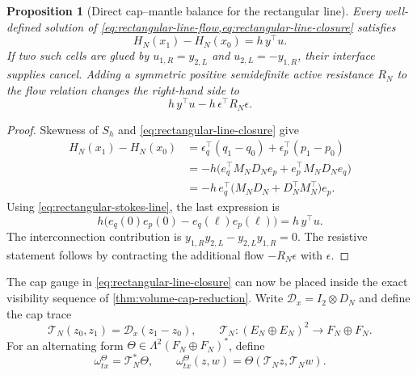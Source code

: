 \documentclass[11pt,a4paper]{article}
\newtheorem{proposition}[theorem]{Proposition}
\begin{document}
\begin{proposition}[Direct cap--mantle balance for the rectangular line]
\label{prop:rectangular-line-power}
Every well-defined solution of
\cref{eq:rectangular-line-flow,eq:rectangular-line-closure} satisfies
\begin{equation}\label{eq:rectangular-line-power}
 H_N(x_1)-H_N(x_0)=h\,y^\top u.
\end{equation}
If two such cells are glued by
\(u_{1,R}=y_{2,L}\) and \(u_{2,L}=-y_{1,R}\), their interface
supplies cancel.  Adding a symmetric positive semidefinite active
resistance \(R_N\) to the flow relation changes the right-hand side to
\[
 h\,y^\top u-h\,\epsilon^\top R_N\epsilon.
\]
\end{proposition}

\begin{proof}
Skewness of \(S_h\) and \cref{eq:rectangular-line-closure} give
\begin{align*}
 H_N(x_1)-H_N(x_0)
 &=\epsilon_q^\top(q_1-q_0)+\epsilon_p^\top(p_1-p_0)\\
 &=-h\bigl(e_q^\top M_ND_Ne_p
            +e_p^\top M_ND_Ne_q\bigr)\\
 &=-h\,e_q^\top
   \bigl(M_ND_N+D_N^\top M_N^\top\bigr)e_p.
\end{align*}
Using \cref{eq:rectangular-stokes-line}, the last expression is
\[
 h\bigl(e_q(0)e_p(0)-e_q(\ell)e_p(\ell)\bigr)=h\,y^\top u.
\]
The interconnection contribution is
\(y_{1,R}y_{2,L}-y_{2,L}y_{1,R}=0\).  The resistive statement follows
by contracting the additional flow \(-R_N\epsilon\) with \(\epsilon\).
\end{proof}

The cap gauge in \cref{eq:rectangular-line-closure} can now be placed
inside the exact visibility sequence of
\cref{thm:volume-cap-reduction}.  Write
\(\mathcal D_x=I_2\otimes D_N\) and define the cap trace
\begin{equation}\label{eq:line-cap-trace}
 \mathcal T_N(z_0,z_1)=\mathcal D_x(z_1-z_0),
 \qquad
 \mathcal T_N:(E_N\oplus E_N)^2\to F_N\oplus F_N.
\end{equation}
For an alternating form
\(\Theta\in\Lambda^2(F_N\oplus F_N)^*\), define
\begin{equation}\label{eq:mixed-cylinder-lift}
 \omega_{tx}^{\Theta}
 =\mathcal T_N^*\Theta,\qquad
 \omega_{tx}^{\Theta}(z,w)
 =\Theta(\mathcal T_Nz,\mathcal T_Nw).
\end{equation}
\end{document}
